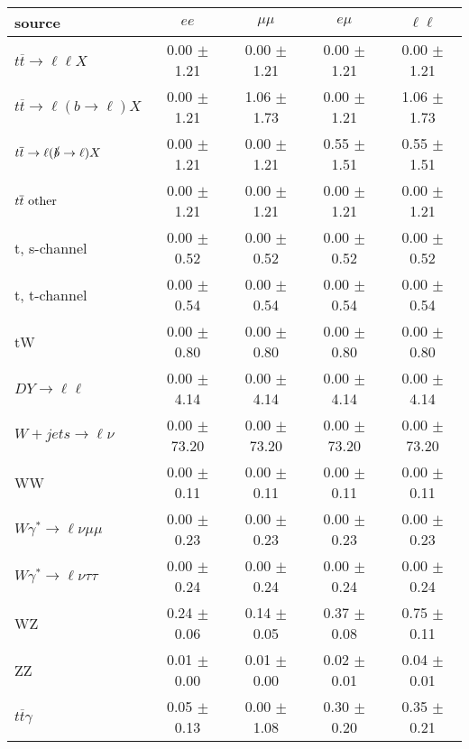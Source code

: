 \begin{tabular}{l|cccc} \hline\hline
source & $ee$ & $\mu\mu$ & $e\mu$ & $\ell\ell $ \\
\hline
$t\overline{t} \rightarrow \ell \ell X$ &  0.00 $\pm$  1.21 &  0.00 $\pm$  1.21 &  0.00 $\pm$  1.21 &  0.00 $\pm$  1.21 \\
$t\overline{t} \rightarrow \ell (b \rightarrow \ell) X$ &  0.00 $\pm$  1.21 &  1.06 $\pm$  1.73 &  0.00 $\pm$  1.21 &  1.06 $\pm$  1.73 \\
$t\overline{t} \rightarrow \ell (\slashed b \rightarrow \ell) X$ &  0.00 $\pm$  1.21 &  0.00 $\pm$  1.21 &  0.55 $\pm$  1.51 &  0.55 $\pm$  1.51 \\
        $t\overline{t}\ \rm{other}$ &  0.00 $\pm$  1.21 &  0.00 $\pm$  1.21 &  0.00 $\pm$  1.21 &  0.00 $\pm$  1.21 \\
\hline
                       t, s-channel &  0.00 $\pm$  0.52 &  0.00 $\pm$  0.52 &  0.00 $\pm$  0.52 &  0.00 $\pm$  0.52 \\
                       t, t-channel &  0.00 $\pm$  0.54 &  0.00 $\pm$  0.54 &  0.00 $\pm$  0.54 &  0.00 $\pm$  0.54 \\
                                 tW &  0.00 $\pm$  0.80 &  0.00 $\pm$  0.80 &  0.00 $\pm$  0.80 &  0.00 $\pm$  0.80 \\
\hline
         $DY \rightarrow \ell \ell$ &  0.00 $\pm$  4.14 &  0.00 $\pm$  4.14 &  0.00 $\pm$  4.14 &  0.00 $\pm$  4.14 \\
      $W+jets \rightarrow \ell \nu$ &  0.00 $\pm$ 73.20 &  0.00 $\pm$ 73.20 &  0.00 $\pm$ 73.20 &  0.00 $\pm$ 73.20 \\
                                 WW &  0.00 $\pm$  0.11 &  0.00 $\pm$  0.11 &  0.00 $\pm$  0.11 &  0.00 $\pm$  0.11 \\
\hline
$W\gamma^{*} \rightarrow \ell \nu \mu\mu$ &  0.00 $\pm$  0.23 &  0.00 $\pm$  0.23 &  0.00 $\pm$  0.23 &  0.00 $\pm$  0.23 \\
$W\gamma^{*} \rightarrow \ell \nu \tau\tau$ &  0.00 $\pm$  0.24 &  0.00 $\pm$  0.24 &  0.00 $\pm$  0.24 &  0.00 $\pm$  0.24 \\
                                 WZ &  0.24 $\pm$  0.06 &  0.14 $\pm$  0.05 &  0.37 $\pm$  0.08 &  0.75 $\pm$  0.11 \\
                                 ZZ &  0.01 $\pm$  0.00 &  0.01 $\pm$  0.00 &  0.02 $\pm$  0.01 &  0.04 $\pm$  0.01 \\
\hline
              $t\overline{t}\gamma$ &  0.05 $\pm$  0.13 &  0.00 $\pm$  1.08 &  0.30 $\pm$  0.20 &  0.35 $\pm$  0.21 \\

\end{tabular}
